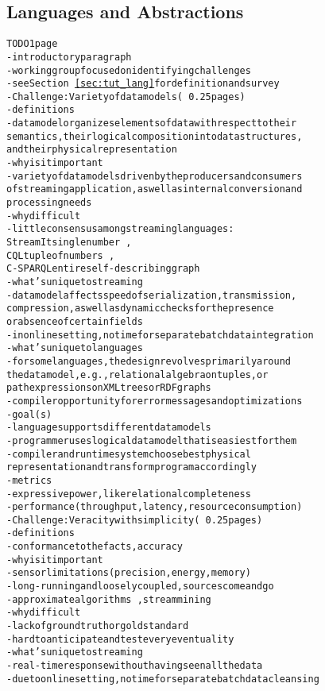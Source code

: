 \subsection{Languages and Abstractions}\label{sec:wg_lang}

\begin{alltt}TODO\scriptsize 1 page
- introductory paragraph
  - working group focused on identifying challenges
  - see Section~\ref{sec:tut_lang} for definition and survey
- Challenge: Variety of data models (~0.25 pages)
  - definitions
    - data model organizes elements of data with respect to their
      semantics, their logical composition into data structures,
      and their physical representation
  - why is it important
    - variety of data models driven by the producers and consumers
      of streaming application, as well as internal conversion and
      processing needs
  - why difficult
    - little consensus among streaming languages:
      StreamIt single number~\cite{thies_et_al_2002},
      CQL tuple of numbers~\cite{arasu_babu_widom_2006},
      C-SPARQL entire self-describing graph~\cite{barbieri_et_al_2009}
  - what's unique to streaming
    - data model affects speed of serialization, transmission,
      compression, as well as dynamic checks for the presence
      or absence of certain fields
    - in online setting, no time for separate batch data integration
  - what's unique to languages
    - for some languages, the design revolves primarily around
      the data model, e.g., relational algebra on tuples, or
      path expressions on XML trees or RDF graphs
    - compiler opportunity for error messages and optimizations
  - goal(s)
    - language supports different data models
    - programmer uses logical data model that is easiest for them
    - compiler and runtime system choose best physical
      representation and transform program accordingly
  - metrics
    - expressive power, like relational completeness
    - performance (throughput, latency, resource consumption)
- Challenge: Veracity with simplicity (~0.25 pages)
  - definitions
    - conformance to the facts, accuracy
  - why is it important
    - sensor limitations (precision, energy, memory)
    - long-running and loosely coupled, sources come and go
    - approximate algorithms~\cite{babcock_et_al_2002}, stream mining~\cite{gaber_zaslavsky_krishnaswamy_2005}
  - why difficult
    - lack of ground truth or gold standard
    - hard to anticipate and test every eventuality
  - what's unique to streaming
    - real-time response without having seen all the data
    - due to online setting, no time for separate batch data cleansing

\end{alltt}
